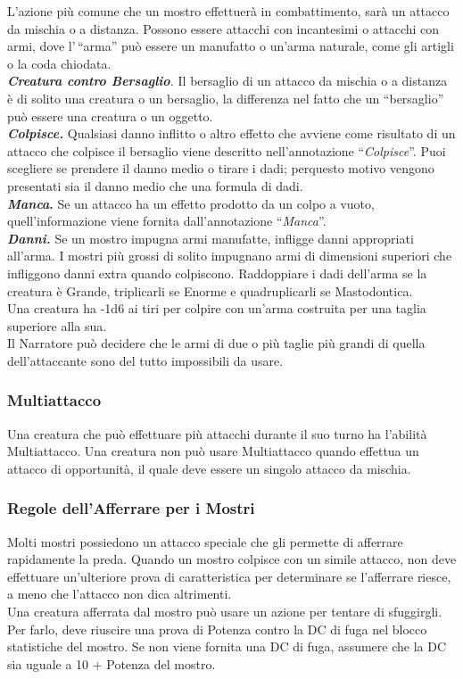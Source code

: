 \begin{multicols}{2}
L'azione più comune che un mostro effettuerà in combattimento, sarà un attacco da mischia o a distanza. Possono essere attacchi con incantesimi o attacchi con armi, dove l'\,``arma'' può essere un manufatto o un'arma naturale, come gli artigli o la coda chiodata.\\
\emph{\textbf{Creatura contro Bersaglio}.} Il bersaglio di un attacco da mischia o a distanza è di solito una creatura o un bersaglio, la differenza nel fatto che un ``bersaglio'' può essere una creatura o un oggetto.\\
\emph{\textbf{Colpisce.}} Qualsiasi danno inflitto o altro effetto che avviene come risultato di un attacco che colpisce il bersaglio viene descritto nell'annotazione ``\emph{Colpisce}''. Puoi scegliere se prendere il danno medio o tirare i dadi; perquesto  motivo vengono presentati sia il danno medio che una formula di dadi. \\
\textbf{\emph{Manca}.} Se un attacco ha un effetto prodotto da un colpo a vuoto, quell'informazione viene fornita dall'annotazione ``\emph{Manca}''.\\
\emph{\textbf{Danni.}} Se un mostro impugna armi manufatte, infligge danni appropriati all'arma. I mostri più grossi di solito impugnano armi di dimensioni superiori che infliggono danni extra quando colpiscono. Raddoppiare i dadi dell'arma se la creatura è Grande, triplicarli se Enorme e quadruplicarli se Mastodontica.\\
Una creatura ha -1d6 ai tiri per colpire con un'arma costruita per una taglia superiore alla sua. \\
Il Narratore può decidere che le armi di due o più taglie più grandi di quella dell'attaccante sono del tutto impossibili da usare.

\subsubsection{Multiattacco}

Una creatura che può effettuare più attacchi durante il suo turno ha l'abilità Multiattacco. Una creatura non può usare Multiattacco quando effettua un attacco di opportunità, il quale deve essere un singolo attacco da mischia.

\subsubsection{Regole dell'Afferrare per i Mostri}

Molti mostri possiedono un attacco speciale che gli permette di afferrare rapidamente la preda. Quando un mostro colpisce con un simile attacco, non deve effettuare un'ulteriore prova di caratteristica per determinare se l'afferrare riesce, a meno che l'attacco non dica altrimenti.\\
Una creatura afferrata dal mostro può usare un azione per tentare di sfuggirgli. Per farlo, deve riuscire una prova di Potenza contro la DC di fuga nel blocco statistiche del
mostro. Se non viene fornita una DC di fuga, assumere che la DC sia uguale a 10 + Potenza del mostro.


\end{multicols}

